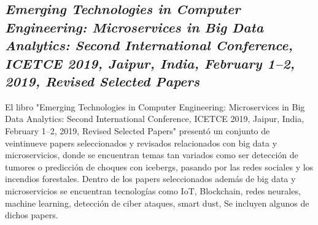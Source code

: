 \subsection{
    \textbf{\emph{Emerging Technologies in Computer Engineering: Microservices in Big Data Analytics: Second International Conference, {ICETCE} 2019, Jaipur, India, February 1–2, 2019, Revised Selected Papers}
    }
}

El libro "Emerging Technologies in Computer Engineering: Microservices in Big Data Analytics: Second International Conference, {ICETCE} 2019, Jaipur, India, February 1–2, 2019, Revised Selected Papers"\cite{somaniEmerging2019} presentó un conjunto de veintinueve papers seleccionados y revisados relacionados con big data y microservicios,
donde se encuentran temas tan variados como ser detección de tumores o predicción de choques con icebergs, pasando por las redes sociales y los incendios forestales.
Dentro de los papers seleccionados además de big data y microservicios se encuentran tecnologías como IoT, Blockchain,
redes neurales, machine learning, detección de ciber ataques, smart dust,
Se incluyen algunos de dichos papers.\par







